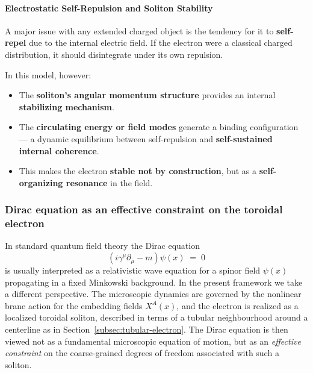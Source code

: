 \paragraph{Electrostatic Self-Repulsion and Soliton
Stability}\label{electrostatic-self-repulsion-and-soliton-stability}

A major issue with any extended charged object is the tendency for it to
\textbf{self-repel} due to the internal electric field. If the electron
were a classical charged distribution, it should disintegrate under its
own repulsion.

In this model, however:

\begin{itemize}
\tightlist
\item
  The \textbf{soliton's angular momentum structure} provides an internal
  \textbf{stabilizing mechanism}.
\item
  The \textbf{circulating energy or field modes} generate a binding
  configuration --- a dynamic equilibrium between self-repulsion and
  \textbf{self-sustained internal coherence}.
\item
  This makes the electron \textbf{stable not by construction}, but as a
  \textbf{self-organizing resonance} in the field.
\end{itemize}

\subsubsection{Dirac equation as an effective constraint on the toroidal electron}
\label{subsec:dirac-effective}

In standard quantum field theory the Dirac equation~\cite{Dirac1928Electron}
\begin{equation}
  (i\gamma^\mu\partial_\mu - m)\psi(x) \;=\; 0
  \label{eq:dirac-equation}
\end{equation}
is usually interpreted as a relativistic wave equation for a spinor
field $\psi(x)$ propagating in a fixed Minkowski background. In the
present framework we take a different perspective. The microscopic
dynamics are governed by the nonlinear brane action for the embedding
fields $X^A(x)$, and the electron is realized as a localized toroidal
soliton, described in terms of a tubular neighbourhood around a
centerline as in Section~\ref{subsec:tubular-electron}. The Dirac
equation is then viewed not as a fundamental microscopic equation of
motion, but as an \emph{effective constraint} on the coarse-grained
degrees of freedom associated with such a soliton.

